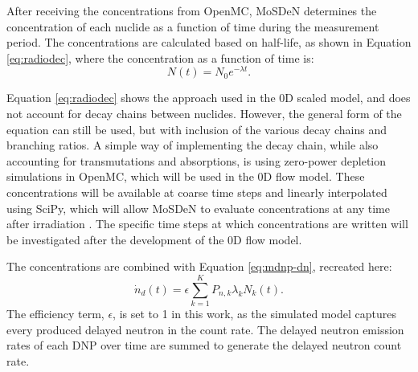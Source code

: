 After receiving the concentrations from OpenMC, \gls{MoSDeN} determines the concentration of each nuclide as a function of time during the measurement period.
The concentrations are calculated based on half-life, as shown in Equation \eqref{eq:radiodec}, where the concentration as a function of time is:
\begin{equation}
    N(t) = N_0 e^{-\lambda t}.
    \label{eq:radiodec}
\end{equation}

Equation \eqref{eq:radiodec} shows the approach used in the 0D scaled model, and does not account for decay chains between nuclides.
However, the general form of the equation can still be used, but with inclusion of the various decay chains and branching ratios.
A simple way of implementing the decay chain, while also accounting for transmutations and absorptions, is using zero-power depletion simulations in OpenMC, which will be used in the 0D flow model.
These concentrations will be available at coarse time steps and linearly interpolated using SciPy, which will allow \gls{MoSDeN} to evaluate concentrations at any time after irradiation \cite{scipy}.
The specific time steps at which concentrations are written will be investigated after the development of the 0D flow model.

The concentrations are combined with Equation \eqref{eq:mdnp-dn}, recreated here:
\begin{equation}
\dot{n}_d(t) = \epsilon \sum_{k=1}^{K} P_{n, k} \lambda_k N_{k}(t).
\nonumber
\end{equation}
The efficiency term, $\epsilon$, is set to 1 in this work, as the simulated model captures every produced delayed neutron in the count rate.
The delayed neutron emission rates of each \gls{DNP} over time are summed to generate the delayed neutron count rate.
